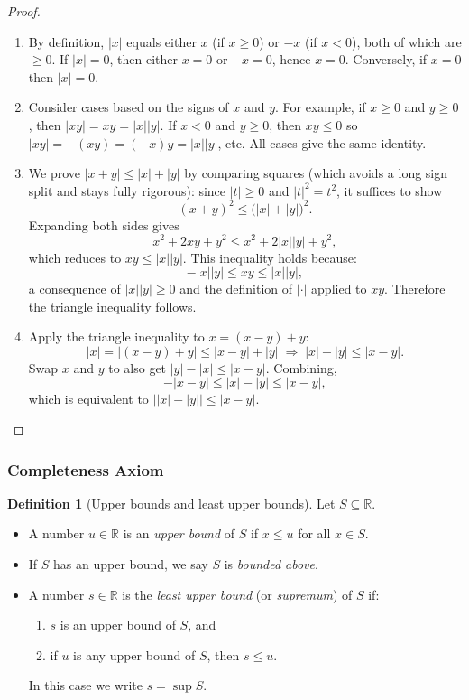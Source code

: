 \documentclass[12pt]{article}
\numberwithin{equation}{section}
\def\abs#1{|#1|}
\newcommand{\RR}{\mathbb{R}}
\DeclarePairedDelimiter{\abs}{\lvert}{\rvert}
\theoremstyle{plain}
\theoremstyle{definition}
\newtheorem{definition}[theorem]{Definition}
\theoremstyle{remark}
\begin{document}
\begin{proof}
\begin{enumerate}[label=(\alph*)]
\item By definition, $\abs{x}$ equals either $x$ (if $x\ge 0$) or $-x$ (if $x<0$), both of which are $\ge 0$.  
If $\abs{x}=0$, then either $x=0$ or $-x=0$, hence $x=0$. Conversely, if $x=0$ then $\abs{x}=0$.
\item Consider cases based on the signs of $x$ and $y$. For example, if $x\ge 0$ and $y\ge 0$, then $\abs{xy}=xy=\abs{x}\abs{y}$.  
If $x<0$ and $y\ge 0$, then $xy\le 0$ so $\abs{xy}=-(xy)=(-x)y=\abs{x}\abs{y}$, etc. All cases give the same identity.
\item We prove $\abs{x+y}\le \abs{x}+\abs{y}$ by comparing squares (which avoids a long sign split and stays fully rigorous):
since $\abs{t}\ge 0$ and $\abs{t}^2=t^2$, it suffices to show
\[
(x+y)^2 \le \bigl(\abs{x}+\abs{y}\bigr)^2.
\]
Expanding both sides gives
\[
x^2 + 2xy + y^2 \le x^2 + 2\abs{x}\abs{y} + y^2,
\]
which reduces to $xy \le \abs{x}\abs{y}$. This inequality holds because:
\[
-\abs{x}\abs{y} \le xy \le \abs{x}\abs{y},
\]
a consequence of $\abs{x}\abs{y}\ge 0$ and the definition of $\abs{\cdot}$ applied to $xy$. Therefore the triangle inequality follows.
\item Apply the triangle inequality to $x=(x-y)+y$:
\[
\abs{x} = \abs{(x-y)+y} \le \abs{x-y}+\abs{y}
\;\Rightarrow\;
\abs{x}-\abs{y}\le \abs{x-y}.
\]
Swap $x$ and $y$ to also get $\abs{y}-\abs{x}\le \abs{x-y}$. Combining,
\[
-\abs{x-y}\le \abs{x}-\abs{y}\le \abs{x-y},
\]
which is equivalent to $\bigl|\abs{x}-\abs{y}\bigr|\le \abs{x-y}$.
\end{enumerate}
\end{proof}

\subsubsection{Completeness Axiom}

\begin{definition}[Upper bounds and least upper bounds]
Let $S\subseteq \RR$.
\begin{itemize}
\item A number $u\in\RR$ is an \emph{upper bound} of $S$ if $x\le u$ for all $x\in S$.
\item If $S$ has an upper bound, we say $S$ is \emph{bounded above}.
\item A number $s\in\RR$ is the \emph{least upper bound} (or \emph{supremum}) of $S$ if:
  \begin{enumerate}[label=(\roman*)]
    \item $s$ is an upper bound of $S$, and
    \item if $u$ is any upper bound of $S$, then $s\le u$.
  \end{enumerate}
In this case we write $s=\sup S$.
\end{itemize}
\end{definition}
\end{document}
